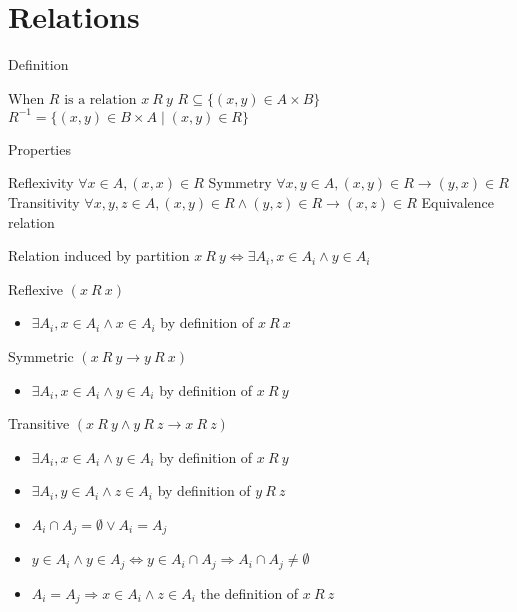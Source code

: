 \section{Relations}
\begin{itemize}
\bulletitem Definition
\begin{itemize}
\bulletitem \( \text{When } R \text{ is a relation } x \: R \: y \)
\bulletitem \( R \subseteq \{ (x,y) \in A \times B \} \)
\bulletitem \( R^{-1} = \{ (x,y) \in B \times A \mid (x,y) \in R \} \)
\end{itemize}
\bulletitem Properties
\begin{itemize}
\bulletitem Reflexivity \( \forall x \in A, (x,x) \in R \)
\bulletitem Symmetry \( \forall x,y \in A, (x,y) \in R \rightarrow (y,x) \in R \)
\bulletitem Transitivity \( \forall x,y,z \in A, (x,y) \in R \land (y,z) \in R \rightarrow (x,z) \in R \)
\bulletitem Equivalence relation
\end{itemize}
\bulletitem Relation induced by partition \( x \: R \: y \Leftrightarrow \exists A_i ,x \in A_i \land y \in A_i \)
\begin{itemize}
\bulletitem Reflexive \( (x \: R \: x) \)
\begin{itemize}
\item[]  \( \exists A_i ,x \in A_i \land x \in A_i \) by definition of  \( x \: R \: x \)
\end{itemize}
\bulletitem Symmetric \( (x \: R \: y \rightarrow y \: R \: x) \)
\begin{itemize}
\item[] \( \exists A_i ,x \in A_i \land y \in A_i \) by definition of  \( x \: R \: y \)
\end{itemize}
\bulletitem Transitive \( (x \: R \: y \land y \: R \: z \rightarrow x \: R \: z) \)
\begin{itemize}
\item[] \( \exists A_i ,x \in A_i \land y \in A_i \) by definition of  \( x \: R \: y \)
\item[] \( \exists A_i ,y \in A_i \land z \in A_i \) by definition of  \( y \: R \: z \)
\item[] \( A_i \cap A_j = \emptyset \lor A_i=A_j \)
\item[] \( y \in A_i \land y \in A_j \Leftrightarrow y \in A_i \cap A_j \Rightarrow A_i \cap A_j \neq \emptyset \)
\item[] \( A_i=A_j \Rightarrow x \in A_i \land z \in A_i \) the definition of  \( x \: R \: z \)
\end{itemize}
\end{itemize}

\end{itemize}
